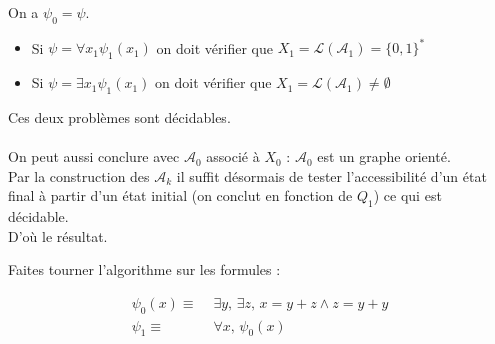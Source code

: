 \documentclass[12pt,letterpaper,boxed]{hmcpset}
\begin{document}
\begin{solution}
On a $\psi_{0} =  \psi$. 
\begin{itemize}
\item Si $\psi = \forall x_{1} \psi_{1}(x_{1})$ on doit vérifier que $X_{1} = \mathcal{L}(\mathcal{A}_{1}) = \{0,1\}^{*}$
\item Si $\psi = \exists x_{1} \psi_{1}(x_{1})$ on doit vérifier que $X_{1} = \mathcal{L}(\mathcal{A}_{1}) \neq \emptyset$
\end{itemize}
Ces deux problèmes sont décidables. \\ \\
On peut aussi conclure avec $\mathcal{A}_{0}$ associé à $X_{0}$ : 
$\mathcal{A}_{0}$ est un graphe orienté. \\
Par la construction des $\mathcal{A}_{k}$ il suffit désormais de tester l'accessibilité d'un état final à partir d'un état initial (on conclut en fonction de $Q_{1}$) ce qui est décidable. \\
D'où le résultat.
\end{solution}
\begin{problem}[Question 6]
Faites tourner l'algorithme sur les formules : 

\begin{align*}
\psi_{0}(x) \equiv \, \, & \exists  y, \, \exists z , \, x = y+z \land z = y + y \\
\psi_{1} \equiv \, \, & \forall x , \, \psi_{0}(x)
\end{align*}

\end{problem}
\end{document}
